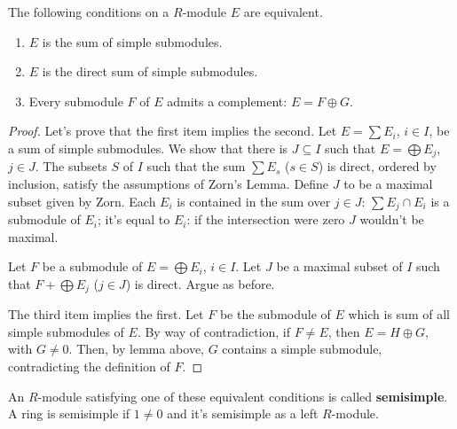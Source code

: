 \begin{thm}
The following conditions on a $R$-module $E$ are equivalent. 
\begin{enumerate}
    \item $E$ is the sum of simple submodules.
    \item $E$ is the direct sum of simple submodules.
    \item Every submodule $F$ of $E$ admits a complement: $E=F \oplus G$.
\end{enumerate}
\begin{proof}
Let's prove that the first item implies the second.
Let $E=\sum E_i$, $i \in I$, be a sum of simple submodules. 
We show that there is $J \subseteq I$ such that $E=\bigoplus E_j$, $j \in J$. 
The subsets $S$ of $I$ such that the sum $\sum E_s$ ($s \in S$) is direct, ordered by inclusion, satisfy the assumptions of Zorn's Lemma. 
Define $J$ to be a maximal subset given by Zorn. 
Each $E_i$ is contained in the sum over $j \in J$: $\sum E_j \cap E_i$ is a submodule of  $E_i$; it's equal to $E_i$: if the intersection were zero $J$ wouldn't be maximal. 

Let $F$ be a submodule of $E = \bigoplus E_i$, $i \in I$. 
Let $J$ be a maximal  subset of $I$ such that $F + \bigoplus E_j$ ($j \in J$) is direct. 
Argue as before. 

The third item implies the first. 
Let $F$ be the submodule of $E$ which is sum of all simple submodules of $E$. 
By way of contradiction, if $F \neq E$, then $E=H \oplus G$, with $G \neq 0$. 
Then, by lemma above, $G$ contains a simple submodule, contradicting the definition of $F$.  \end{proof}
\end{thm}

An $R$-module satisfying one of these equivalent conditions is called \textbf{semisimple}. 
A ring is semisimple if $1\neq 0$ and it's semisimple as a left $R$-module. 

